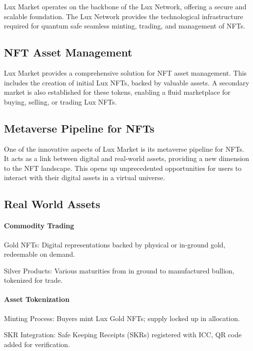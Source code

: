 \documentclass[11pt]{article}
\begin{document}
Lux Market operates on the backbone of the Lux Network, offering a secure and scalable foundation. The Lux Network provides the technological infrastructure required for quantum safe seamless minting, trading, and management of NFTs.


\subsection{NFT Asset Management}

Lux Market provides a comprehensive solution for NFT asset management. This includes the creation of initial Lux NFTs, backed by valuable assets. A secondary market is also established for these tokens, enabling a fluid marketplace for buying, selling, or trading Lux NFTs.


\subsection{Metaverse Pipeline for NFTs}

One of the innovative aspects of Lux Market is its metaverse pipeline for NFTs. It acts as a link between digital and real-world assets, providing a new dimension to the NFT landscape. This opens up unprecedented opportunities for users to interact with their digital assets in a virtual universe.


\subsection{Real World Assets}

\paragraph{Commodity Trading}

Gold NFTs: Digital representations backed by physical or in-ground gold, redeemable on demand.


Silver Products: Various maturities from in ground to manufactured bullion, tokenized for trade.


\paragraph{Asset Tokenization}

Minting Process: Buyers mint Lux Gold NFTs; supply locked up in allocation.


SKR Integration: Safe Keeping Receipts (SKRs) registered with ICC, QR code added for verification.
\end{document}
